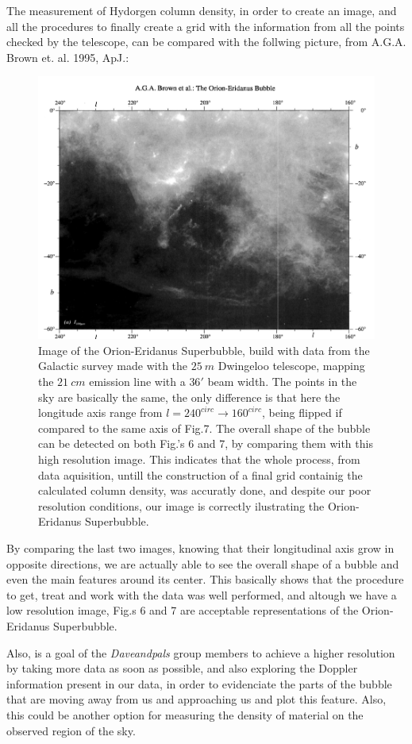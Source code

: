 \documentclass{article}
\begin{document}
The measurement of Hydorgen column density, in order to create an image, and all the procedures
to finally create a grid with the information from all the points checked by the telescope,
can be compared with the follwing picture, from
A.G.A. Brown et. al. 1995, ApJ.:

\begin{figure}[H]
\center
\includegraphics[scale=0.48]{article.png}
\caption {Image of the Orion-Eridanus Superbubble, build with
data from the Galactic survey made with the $25 \ m$ Dwingeloo telescope, mapping the
$21 \ cm$ emission line with a $36'$ beam width. The points in the sky are basically the same,
the only difference is that here the longitude axis range from $l=240^{circ}\rightarrow 160^{circ}$,
being flipped if compared to the same axis of Fig.7. The overall shape of
the bubble can be detected on both Fig.'s 6 and 7, by comparing them with this high resolution
image. This indicates that the whole process, from data aquisition, untill the 
construction of a final grid containig the calculated column density, 
was accuratly done, and despite our poor resolution
conditions, our image is correctly ilustrating the Orion-Eridanus Superbubble.} 
\label{moon_win}
\end{figure}

By comparing the last two images, knowing that their longitudinal 
axis grow in opposite directions, we are actually able to see the overall 
shape of a bubble and even the main features around its center. This basically 
shows that the procedure to get, treat and work with the data was well performed,
and altough we have a low resolution image, Fig.s 6 and 7 are acceptable 
representations of the Orion-Eridanus Superbubble.

Also, is a goal of the \emph{Daveandpals} group members to achieve a higher resolution by taking 
more data as soon as possible, and also exploring the Doppler information present in our data,
in order to evidenciate the parts of the bubble that are moving away from us
and approaching us and plot this feature. Also,
this could be  another option for measuring the density of material on the 
observed region of the sky. 
\end{document}
